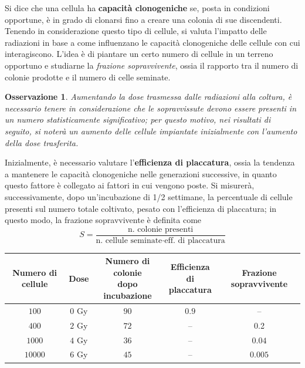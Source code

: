 \documentclass[11pt, a4paper]{scrartcl}
\theoremstyle{style}
\newtheorem{osservazione}{Osservazione}[section]
\theoremstyle{style1}
\numberwithin{equation}{subsection}
\begin{document}
Si dice che una cellula ha \textbf{capacit\`a clonogeniche} se, posta in condizioni opportune, \`e in grado di clonarsi fino a creare una colonia di sue discendenti.
Tenendo in considerazione questo tipo di cellule, si valuta l'impatto delle radiazioni in base a come influenzano le capacit\`a clonogeniche delle cellule con cui interagiscono.
L'idea \`e di piantare un certo numero di cellule in un terreno opportuno e studiarne la \textit{frazione sopravvivente}, ossia il rapporto tra il numero di colonie prodotte e il numero di celle seminate.
\begin{osservazione}
Aumentando la dose trasmessa dalle radiazioni alla coltura, \`e necessario tenere in considerazione che le sopravvissute devono essere presenti in un numero statisticamente significativo; per questo motivo, nei risultati di seguito, si noter\`a un aumento delle cellule impiantate inizialmente con l'aumento della dose trasferita.
\end{osservazione}

\noindent Inizialmente, \`e necessario valutare l'\textbf{efficienza di placcatura}, ossia la tendenza a mantenere le capacit\`a clonogeniche nelle generazioni successive, in quanto questo fattore \`e collegato ai fattori in cui vengono poste.
Si misurer\`a, successivamente, dopo un'incubazione di 1/2 settimane, la percentuale di cellule presenti sul numero totale coltivato, pesato con l'efficienza di placcatura; in questo modo, la frazione sopravvivente \`e definita come
\begin{equation}
	S = \frac{\text{n. colonie presenti}}{\text{n. cellule seminate}\cdot \text{eff. di placcatura}}
\end{equation}
\begin{table}[h!]
	\centering
	\begin{tabular}{c c c c c}
		Numero di cellule & Dose & \makecell[cc]{Numero di colonie\\ dopo incubazione} & \makecell[cc]{Efficienza \\ di placcatura}& Frazione sopravvivente\\
	\hline
		$100$ & $0$ Gy & $90$ & $0.9$ &--\\
		$400$ & $2$ Gy & $72$ &-- &0.2\\
		$1000$ & $4$ Gy & $36$ &-- &$0.04$\\
		$10000$ & $6$ Gy & $45$ &-- &$0.005$\\
	\hline
	\end{tabular}
\end{table}
\end{document}
